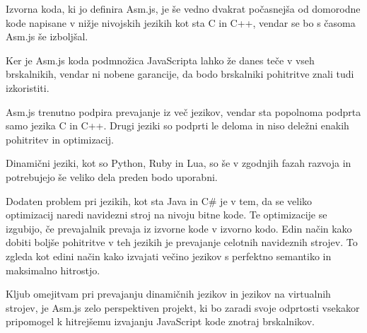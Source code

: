 Izvorna koda, ki jo definira Asm.js, je še vedno dvakrat počasnejša od domorodne kode napisane v nižje nivojskih jezikih kot sta C in C++, vendar se bo s časoma Asm.js še izboljšal.

Ker je Asm.js koda podmnožica JavaScripta lahko že danes teče v vseh brskalnikih, vendar ni nobene garancije, da bodo brskalniki pohitritve znali tudi izkoristiti.

Asm.js trenutno podpira prevajanje iz več jezikov, vendar sta popolnoma podprta samo jezika C in C++. Drugi jeziki so podprti le deloma in niso deležni enakih pohitritev in optimizacij.

Dinamični jeziki, kot so Python, Ruby in Lua, so še v zgodnjih fazah razvoja in potrebujejo še veliko dela preden bodo uporabni.

Dodaten problem pri jezikih, kot sta Java in C\# je v tem, da se veliko optimizacij naredi navidezni stroj na nivoju bitne kode. Te optimizacije se izgubijo, če prevajalnik prevaja iz izvorne kode v izvorno kodo. Edin način kako dobiti boljše pohitritve v teh jezikih je prevajanje celotnih navideznih strojev. To zgleda kot edini način kako izvajati večino jezikov s perfektno semantiko in maksimalno hitrostjo.

Kljub omejitvam pri prevajanju dinamičnih jezikov in jezikov na virtualnih strojev, je Asm.js zelo perspektiven projekt, ki bo zaradi svoje odprtosti vsekakor pripomogel k hitrejšemu izvajanju JavaScript kode znotraj brskalnikov.
